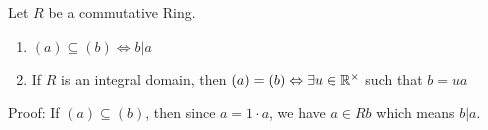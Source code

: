 \begin{lemma}[]
Let $R$ be a commutative Ring.
\begin{enumerate}
				\item $(a) \subseteq (b) \Leftrightarrow b | a$
				\item If $R$ is an integral domain, then $(a) = (b) \Leftrightarrow \exists u \in \mathbb{R}^\times$ such that $b = ua$
\end{enumerate}

Proof: If $(a) \subseteq (b)$, then since $a = 1 \cdot a$, we have $a \in Rb$ which means $b|a$.
\end{lemma}
